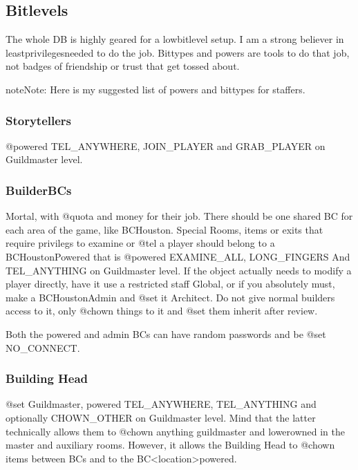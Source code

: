 \documentclass[letterpaper,10pt,english]{sphinxmanual}
\begin{document}
\subsection{Bitlevels}
\label{\detokenize{gettingstarted:bitlevels}}
\sphinxAtStartPar
The whole DB is highly geared for a low\sphinxhyphen{}bitlevel setup.
I am a strong believer in least\sphinxhyphen{}privileges\sphinxhyphen{}needed to do the job. Bittypes and
powers are tools to do that job, not badges of friendship or trust that get
tossed about.

\begin{sphinxadmonition}{note}{Note:}
\sphinxAtStartPar
Here is my suggested list of powers and bittypes for staffers.
\end{sphinxadmonition}


\subsubsection{Storytellers}
\label{\detokenize{gettingstarted:storytellers}}
\sphinxAtStartPar
@powered TEL\_ANYWHERE, JOIN\_PLAYER and GRAB\_PLAYER on Guildmaster level.


\subsubsection{Builder\sphinxhyphen{}BCs}
\label{\detokenize{gettingstarted:builder-bcs}}
\sphinxAtStartPar
Mortal, with @quota and money for their job. There should be one
shared BC for each area of the game, like BC\sphinxhyphen{}Houston. Special
Rooms, items or exits that require privilegs to examine or @tel
a player should belong to a BC\sphinxhyphen{}Houston\sphinxhyphen{}Powered that is @powered
EXAMINE\_ALL, LONG\_FINGERS And TEL\_ANYTHING on Guildmaster level.
If the object actually needs to modify a player directly, have
it use a restricted staff Global, or if you absolutely must,
make a BC\sphinxhyphen{}Houston\sphinxhyphen{}Admin and @set it Architect. Do not give
normal builders access to it, only @chown things to it and @set
them inherit after review.

\sphinxAtStartPar
Both the \sphinxhyphen{}powered and \sphinxhyphen{}admin BCs can have random passwords and
be @set NO\_CONNECT.


\subsubsection{Building Head}
\label{\detokenize{gettingstarted:building-head}}
\sphinxAtStartPar
@set Guildmaster, powered TEL\_ANYWHERE, TEL\_ANYTHING and
optionally CHOWN\_OTHER on Guildmaster level. Mind that the
latter technically allows them to @chown anything guildmaster\sphinxhyphen{}
and lower\sphinxhyphen{}owned in the master and auxiliary rooms. However,
it allows the Building Head to @chown items between BCs\sphinxhyphen{} and
to the BC\sphinxhyphen{}\textless{}location\textgreater{}\sphinxhyphen{}powered.
\end{document}

